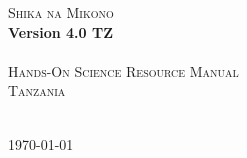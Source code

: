 \begin{titlepage}
\begin{center}
	\textsc{{\Huge Shika na Mikono}}\\[0.4cm]
	\textbf{{\huge Version 4.0 TZ}}\\[1.5cm]
	\HRule\\[0.4cm]
	\textsc{{\Large Hands-On Science Resource Manual}}\\[0.4cm]
	\textsc{{\Large Tanzania}}\\[0.4cm]
	\HRule\\[0.5cm]
\end{center}

\vfill
\begin{center}
	{\large \today}
\end{center}
\end{titlepage}
